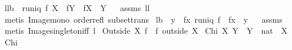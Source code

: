 \begin{isabellebody}
\endisatagproof
{\isafoldproof}%
%
\isadelimproof
%
\endisadelimproof
\isanewline
\isanewline
{}\isamarkupfalse%
\ ll{}{}b{\isacharcolon}\ \ {\isachardoublequoteopen}runiq\ f{\isachardoublequoteclose}\ {\isachardoublequoteopen}X\ {\isasymsubseteq}\ {\isacharparenleft}f{\isacharcircum}{\isacharminus}{}{\isacharparenright}{\isacharbackquote}{\isacharbackquote}Y{\isachardoublequoteclose}\ \ {\isachardoublequoteopen}f{\isacharbackquote}{\isacharbackquote}X\ {\isasymsubseteq}\ Y{\isachardoublequoteclose}%
\isadelimproof
\ %
\endisadelimproof
%
\isatagproof
{}\isamarkupfalse%
\ assms\ ll{}{}\ \isamarkupfalse%
\ {\isacharparenleft}metis\ Image{\isacharunderscore}mono\ order{\isacharunderscore}refl\ subset{\isacharunderscore}trans{\isacharparenright}%
\endisatagproof
{\isafoldproof}%
%
\isadelimproof
%
\endisadelimproof
\isanewline
\isanewline
{}\isamarkupfalse%
\ l{}{}b{\isacharcolon}\ \ {\isachardoublequoteopen}y\ {\isasymin}\ f{\isacharbackquote}{\isacharbackquote}{\isacharbraceleft}x{\isacharbraceright}{\isachardoublequoteclose}\ {\isachardoublequoteopen}runiq\ f{\isachardoublequoteclose}\ \ {\isachardoublequoteopen}f{\isacharcomma}{\isacharcomma}x\ {\isacharequal}\ y{\isachardoublequoteclose}%
\isadelimproof
\ %
\endisadelimproof
%
\isatagproof
{}\isamarkupfalse%
\ assms\isanewline
{}\isamarkupfalse%
\ {\isacharparenleft}metis\ Image{\isacharunderscore}singleton{\isacharunderscore}iff\ l{}{}{\isacharparenright}%
\endisatagproof
{\isafoldproof}%
%
\isadelimproof
%
\endisadelimproof
%
\isamarkuptrue%
\isamarkupfalse%
\ {\isachardoublequoteopen}Outside{\isacharprime}\ X\ f\ {\isacharequal}{\isacharequal}\ f\ outside\ X{\isachardoublequoteclose}\isanewline
{}\isamarkupfalse%
\ {\isachardoublequoteopen}Chi\ X\ Y\ {\isacharequal}{\isacharequal}\ {\isacharparenleft}Y\ {\isasymtimes}\ {\isacharbraceleft}{}{\isacharcolon}{\isacharcolon}nat{\isacharbraceright}{\isacharparenright}\ {\isacharplus}{\isacharasterisk}\ {\isacharparenleft}X\ {\isasymtimes}\ {\isacharbraceleft}{}{\isacharbraceright}{\isacharparenright}{\isachardoublequoteclose}\isanewline
{}\isamarkupfalse%
\ Chi\ {\isacharparenleft}\ {\isachardoublequoteopen}{\isacharless}{\isacharbar}{\isacharbar}{\isachardoublequoteclose}\ {}{}{\isacharparenright}\isanewline

\end{isabellebody}
